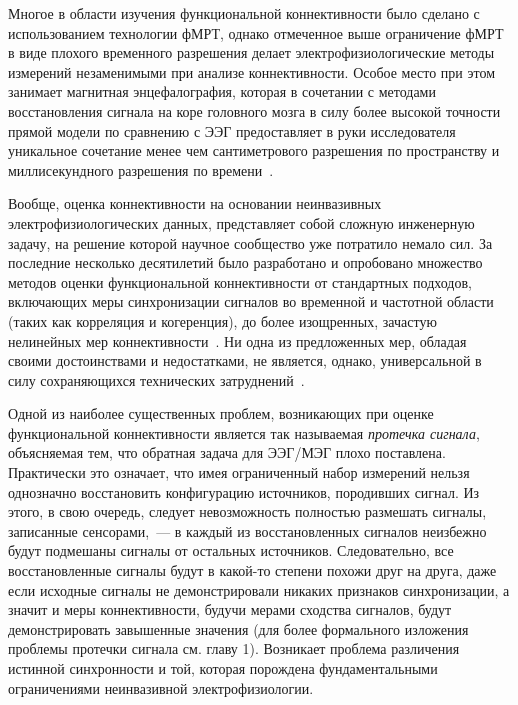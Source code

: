 Многое в области изучения функциональной коннективности было сделано с
использованием технологии фМРТ, однако отмеченное выше ограничение фМРТ в виде
плохого временного разрешения делает электрофизиологические методы измерений
незаменимыми при анализе коннективности. Особое место при этом занимает
магнитная энцефалография, которая в сочетании с методами восстановления сигнала
на коре головного мозга в силу более высокой точности прямой модели по
сравнению с ЭЭГ предоставляет в руки исследователя уникальное сочетание менее
чем сантиметрового разрешения по пространству и миллисекундного разрешения по
времени~\cite{hamalainen, Baillet, Gross2013}.



Вообще, оценка коннективности на основании неинвазивных электрофизиологических
данных, представляет собой сложную инженерную задачу, на решение которой
научное сообщество уже потратило немало сил.  За последние несколько
десятилетий было разработано и опробовано множество методов оценки
функциональной коннективности от стандартных подходов, включающих меры
синхронизации сигналов во временной и частотной области (таких как корреляция и
когеренция), до более изощренных, зачастую нелинейных мер
коннективности~\cite{Marzetti2008, Schoffelen2009, Colclough2015, kaminski,
greenblatt_conn, hillebrand, imcoh, Lachaux1999, env_corr, Brookes2012,
Brookes2011, Hillebrand2012, Hipp2012, PLI, wPLI, Chella2015, Chella2016,
Wibral2011, Ioannides2000}.  Ни одна из предложенных мер, обладая своими
достоинствами и недостатками, не является, однако, универсальной в силу
сохраняющихся технических затруднений~\cite{Colclough2016, Bastos2016}.

Одной из наиболее существенных проблем, возникающих при оценке функциональной
коннективности является так называемая \emph{протечка сигнала}, объясняемая
тем, что обратная задача для ЭЭГ/МЭГ плохо поставлена. Практически это
означает, что имея ограниченный набор измерений нельзя однозначно восстановить
конфигурацию источников, породивших сигнал. Из этого, в свою очередь, следует
невозможность полностью размешать сигналы, записанные сенсорами,~--- в каждый
из восстановленных сигналов неизбежно будут подмешаны сигналы от остальных
источников. Следовательно, все восстановленные сигналы будут в какой-то степени
похожи друг на друга, даже если исходные сигналы не демонстрировали никаких
признаков синхронизации, а значит и меры коннективности, будучи мерами сходства
сигналов, будут демонстрировать завышенные значения (для более формального
изложения проблемы протечки сигнала см. главу 1). Возникает проблема различения
истинной синхронности и той, которая порождена фундаментальными ограничениями
неинвазивной электрофизиологии.

